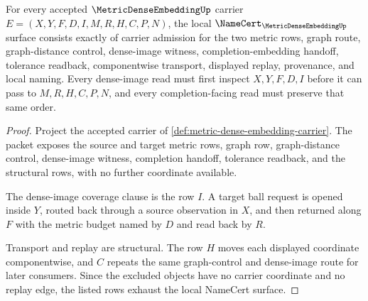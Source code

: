 \begin{theorem}
\label{thm:metric-dense-embedding-namecert-obligations}
For every accepted $\MetricDenseEmbeddingUp$ carrier $E=(X,Y,F,D,I,M,R,H,C,P,N)$, the local $\NameCert_{\MetricDenseEmbeddingUp}$ surface consists exactly of carrier admission for the two metric rows, graph route, graph-distance control, dense-image witness, completion-embedding handoff, tolerance readback, componentwise transport, displayed replay, provenance, and local naming. Every dense-image read must first inspect $X,Y,F,D,I$ before it can pass to $M,R,H,C,P,N$, and every completion-facing read must preserve that same order.
\end{theorem}
\begin{proof}
Project the accepted carrier of \autoref{def:metric-dense-embedding-carrier}. The packet exposes the source and target metric rows, graph row, graph-distance control, dense-image witness, completion handoff, tolerance readback, and the structural rows, with no further coordinate available.

The dense-image coverage clause is the row $I$. A target ball request is opened inside $Y$, routed back through a source observation in $X$, and then returned along $F$ with the metric budget named by $D$ and read back by $R$.

Transport and replay are structural. The row $H$ moves each displayed coordinate componentwise, and $C$ repeats the same graph-control and dense-image route for later consumers. Since the excluded objects have no carrier coordinate and no replay edge, the listed rows exhaust the local NameCert surface.
\end{proof}

